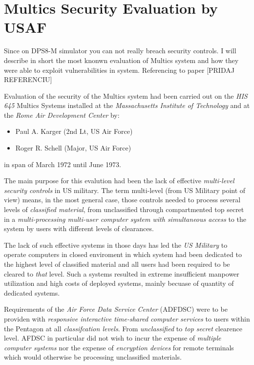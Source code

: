 \section{Multics Security Evaluation by USAF}

Since on DPS8-M simulator you can not really breach security controls. I will describe in short the most knonwn evaluation of 
Multics system and how they were able to exploit vulnerabilities in system. Referencing to paper [PRIDAJ REFERENCIU]

Evaluation of the security of the Multics system had been carried out on the \textit{HIS 645} 
Multics Systems installed at the \textit{Massachusetts Institute of Technology} and at the 
\textit{Rome Air Development Center} by:
\begin{itemize}
    \item Paul A. Karger (2nd Lt, US Air Force)
    \item Roger R. Schell (Major, US Air Force)
\end{itemize}
in span of March 1972 until June 1973.

The main purpose for this evalution had been the lack of effective \textit{multi-level security controls}
in US military. The term multi-level (from US Military point of view) means, in the most general case, 
those controls needed to process several levels of \textit{classified material}, from unclassified 
through compartmented top secret in a \textit{multi-processing multi-user computer system with simultaneous 
access} to the system by users with different levels of clearances.

The lack of such effective systems in those days has led the \textit{US Military} to operate computers
in closed enviroment in which system had been dedicated to the highest level of classified material and
all users had been required to be cleared to \textit{that} level.
Such a systems resulted in extreme insufficient manpower utilization and high costs of deployed systems,
mainly becuase of quantity of dedicated systems. 

Requirements of the \textit{Air Force Data Service Center} (ADFDSC) were to be providen with 
\textit{responsive interactive time-shared computer services} to users within the Pentagon
at all \textit{classifcation levels}. From \textit{unclassified} to \textit{top secret} clearence level.
AFDSC in particular did not wish to incur the expense of \textit{multiple computer systems} nor the expense of 
\textit{encryption devices} for remote terminals which would otherwise be processing unclassified materials.

